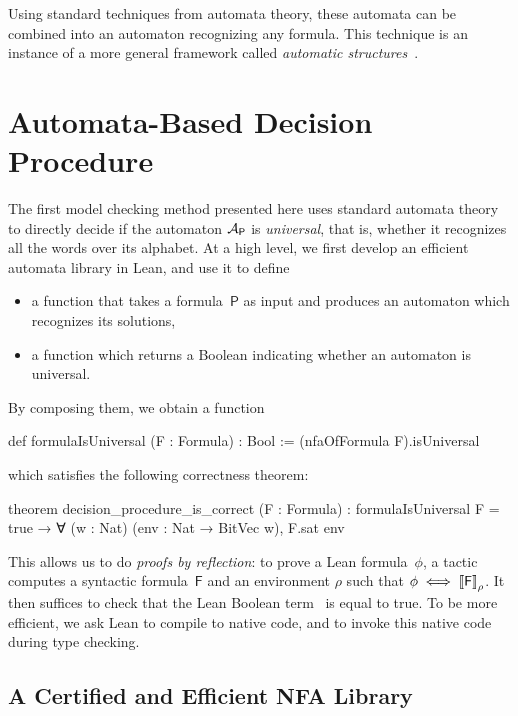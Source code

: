 %
Using standard techniques from automata theory, these automata can be combined
into an automaton recognizing any formula.
%
This technique is an instance of a more general framework called \emph{automatic
structures}~\citep{automatic-structures}.

\section{Automata-Based Decision Procedure}
\label{sec:swbv:automata}

The first model checking method presented here uses standard automata theory to
directly decide if the automaton $\mathcal{A}_{\mathsf{P}}$ is \emph{universal}, that
is, whether it recognizes all the words over its alphabet.
%
At a high level, we first develop an efficient automata library in Lean, and
use it to define
\begin{itemize}
  \item a function  that takes a
    formula~$\mathsf{P}$ as input and produces an automaton which recognizes its
    solutions,
  \item a function  which returns a Boolean
    indicating whether an automaton is universal.
\end{itemize}
%
By composing them, we obtain a function
\begin{lean}
  def formulaIsUniversal (F : Formula) : Bool :=
    (nfaOfFormula F).isUniversal
\end{lean}
which satisfies the following correctness theorem:

\begin{lean}
  theorem decision_procedure_is_correct (F : Formula) :
      formulaIsUniversal F = true → ∀ (w : Nat) (env : Nat → BitVec w), F.sat env
\end{lean}

This allows us to do \emph{proofs by reflection}: to prove a Lean
formula~$\phi$, a tactic computes a syntactic formula~$\mathsf{F}$ and an
environment $\rho$ such that $\phi \iff \left\llbracket \mathsf{F} \right\rrbracket_\rho$.
%
It then suffices to check that the Lean Boolean
term~ is equal to true.
%
To be more efficient, we ask Lean to compile
 to native code, and to invoke this native
code during type checking.

\subsection{A Certified and Efficient NFA Library}

